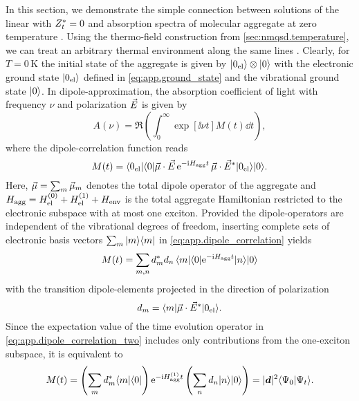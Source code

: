 In this section, we demonstrate the simple connection between solutions of the linear \NMSSE with ${Z}^*_t = 0$ and absorption spectra of molecular aggregate at zero temperature \cite{RoEiWo09_aggregats,RoStEi11_nmqsd_aggregats}.
Using the thermo-field construction from \autoref{sec:nmqsd.temperature}, we can treat an arbitrary thermal environment along the same lines \cite{RiStEi13_prep}.
Clearly, for $T = 0\,\mathrm{K}$ the initial state of the aggregate is given by $| 0_\mathrm{el} \rangle\otimes| 0 \rangle$ with the electronic ground state $| 0_\mathrm{el} \rangle$ defined in \autoref{eq:app.ground_state} and the vibrational ground state $| 0 \rangle$.
In dipole-approximation, the absorption coefficient of light with frequency $\nu$ and polarization $\rvec{E}$ is given by \cite{MaKu11_dynamics}
\begin{equation}
  A(\nu) = \Re \left( \int_0^\infty \exp[\ii\nu t] M(t) \dd t \right),
  \label{eq:app.absorption}
\end{equation}
where the dipole-correlation function reads
\begin{equation}
  M(t) = \bra{0_\mathrm{el}}\bra{0} \rvec\mu\cdot\rvec{E} \, \exp[-\ii \opH{agg} t] \, \rvec\mu\cdot\cc{\rvec{E}} \ket{0_\mathrm{el}}\ket{0}.
  \label{eq:app.dipole_correlation}
\end{equation}
Here, $\rvec\mu = \sum_m \rvec\mu_m$ denotes the total dipole operator of the aggregate and $H_\mathrm{agg} = H_\mathrm{el}^{(0)} + H_\mathrm{el}^{(1)} + H_\mathrm{env}$ is the total aggregate Hamiltonian restricted to the electronic subspace with at most one exciton.
Provided the dipole-operators are independent of the vibrational degrees of freedom, inserting complete sets of electronic basis vectors $\sum_m | m \rangle\langle m |$ in \autoref{eq:app.dipole_correlation} yields
\begin{equation}
  M(t) = \sum_{m,n} \cc{d}_m d_n \, \bra{m}\bra{0} \exp[-\ii \opH{agg} t] \ket{n} \ket{0}
  \label{eq:app.dipole_correlation_two}
\end{equation}
with the transition dipole-elements projected in the direction of polarization
\begin{equation*}
  d_m = \bra{m} \rvec\mu \cdot \cc{\rvec{E}} \ket{0_\mathrm{el}}.
\end{equation*}
Since the expectation value of the time evolution operator in \autoref{eq:app.dipole_correlation_two} includes only contributions from the one-exciton subspace, it is equivalent to
\begin{equation*}
  M(t) = \left(\sum_m \cc{d}_m \bra{m}\bra{0} \right) \exp[-\ii \opH{agg}^{(1)} t] \left(\sum_n d_n \ket{n}\ket{0} \right) = \abs{\vec{d}}^2 \braket{\Psi_0}{\Psi_t}.
\end{equation*}

